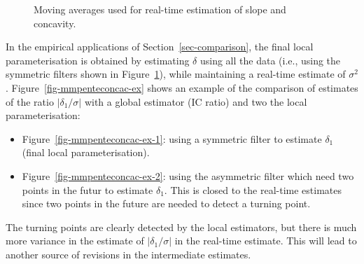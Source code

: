 \documentclass[
]{article}
\newcommand\1{\mathds{1}}
\begin{document}
\begin{figure}[H]

\caption{\label{fig-mmpenteconcac}Moving averages used for real-time
estimation of slope and concavity.}


\end{figure}%

In the empirical applications of Section~\ref{sec-comparison}, the final
local parameterisation is obtained by estimating \(\delta\) using all
the data (i.e., using the symmetric filters shown in
Figure~\ref{fig-mmpenteconcac}), while maintaining a real-time estimate
of \(\sigma^2\). Figure~\ref{fig-mmpenteconcac-ex} shows an example of
the comparison of estimates of the ratio \(|\delta_1/\sigma|\) with a
global estimator (IC ratio) and two the local parameterisation:

\begin{itemize}
\item
  Figure~\ref{fig-mmpenteconcac-ex-1}: using a symmetric filter to
  estimate \(\delta_1\) (final local parameterisation).
\item
  Figure~\ref{fig-mmpenteconcac-ex-2}: using the asymmetric filter which
  need two points in the futur to estimate \(\delta_1\). This is closed
  to the real-time estimates since two points in the future are needed
  to detect a turning point.
\end{itemize}

The turning points are clearly detected by the local estimators, but
there is much more variance in the estimate of \(|\delta_1/\sigma|\) in
the real-time estimate. This will lead to another source of revisions in
the intermediate estimates.
\end{document}
